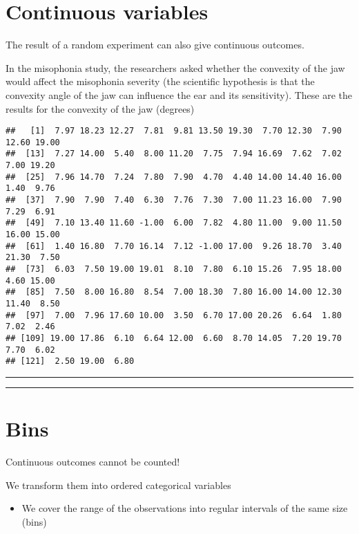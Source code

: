 \documentclass[
]{book}
\providecommand{\tightlist}{%
  \setlength{\itemsep}{0pt}\setlength{\parskip}{0pt}}
\begin{document}
\hypertarget{continuous-variables}{%
\section{Continuous variables}\label{continuous-variables}}

The result of a random experiment can also give continuous outcomes.

In the misophonia study, the researchers asked whether the convexity of the jaw would affect the misophonia severity (the scientific hypothesis is that the convexity angle of the jaw can influence the ear and its sensitivity). These are the results for the convexity of the jaw (degrees)

\begin{verbatim}
##   [1]  7.97 18.23 12.27  7.81  9.81 13.50 19.30  7.70 12.30  7.90 12.60 19.00
##  [13]  7.27 14.00  5.40  8.00 11.20  7.75  7.94 16.69  7.62  7.02  7.00 19.20
##  [25]  7.96 14.70  7.24  7.80  7.90  4.70  4.40 14.00 14.40 16.00  1.40  9.76
##  [37]  7.90  7.90  7.40  6.30  7.76  7.30  7.00 11.23 16.00  7.90  7.29  6.91
##  [49]  7.10 13.40 11.60 -1.00  6.00  7.82  4.80 11.00  9.00 11.50 16.00 15.00
##  [61]  1.40 16.80  7.70 16.14  7.12 -1.00 17.00  9.26 18.70  3.40 21.30  7.50
##  [73]  6.03  7.50 19.00 19.01  8.10  7.80  6.10 15.26  7.95 18.00  4.60 15.00
##  [85]  7.50  8.00 16.80  8.54  7.00 18.30  7.80 16.00 14.00 12.30 11.40  8.50
##  [97]  7.00  7.96 17.60 10.00  3.50  6.70 17.00 20.26  6.64  1.80  7.02  2.46
## [109] 19.00 17.86  6.10  6.64 12.00  6.60  8.70 14.05  7.20 19.70  7.70  6.02
## [121]  2.50 19.00  6.80
\end{verbatim}

\begin{center}\rule{0.5\linewidth}{0.5pt}\end{center}

\begin{center}\rule{0.5\linewidth}{0.5pt}\end{center}

\hypertarget{bins}{%
\section{Bins}\label{bins}}

Continuous outcomes cannot be counted!

We transform them into ordered categorical variables

\begin{itemize}
\tightlist
\item
  We cover the range of the observations into regular intervals of the same size (bins)
\end{itemize}
\end{document}

